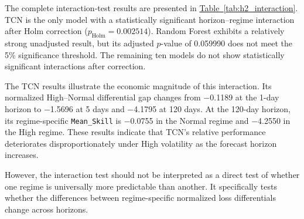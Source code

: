 \documentclass[12pt,twoside]{ord}
\begin{document}
The complete interaction-test results are presented in \hyperref[tab:h2_interaction]{Table~\ref*{tab:h2_interaction}}. TCN is the only model with a statistically significant horizon--regime interaction after Holm correction ($p_{\mathrm{Holm}}=0.002514$). Random Forest exhibits a relatively strong unadjusted result, but its adjusted $p$-value of 0.059990 does not meet the 5\% significance threshold. The remaining ten models do not show statistically significant interactions after correction.

The TCN results illustrate the economic magnitude of this interaction. Its normalized High--Normal differential gap changes from $-$0.1189 at the 1-day horizon to $-$1.5696 at 5 days and $-$4.1795 at 120 days. At the 120-day horizon, its regime-specific \texttt{Mean\_Skill} is $-$0.0755 in the Normal regime and $-$4.2550 in the High regime. These results indicate that TCN's relative performance deteriorates disproportionately under High volatility as the forecast horizon increases.

However, the interaction test should not be interpreted as a direct test of whether one regime is universally more predictable than another. It specifically tests whether the differences between regime-specific normalized loss differentials change across horizons.
\end{document}
